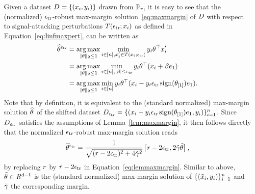 



Given a dataset $D = \{(x_i, y_i)\}$ drawn from $\mathbb{P}_r$, it is easy to see that the (normalized) $\epsilon_{\text{tr}}$-robust max-margin solution~\eqref{eq:maxmargin} of $D$ with respect to signal-attacking perturbations $T({\epsilon_{\text{tr}}};{x_i})$ as defined in Equation~\eqref{eq:linfmaxpert}, can be written as
\begin{equation}
\begin{aligned}
  \label{eq:robmaxmargin}
  \widehat{\theta}^{\epsilon_{\text{tr}}} &= \operatorname*{arg\,max}_{\|\theta\|_2\leq 1}  \min_{i\in [n], x_i' \in T({x_i};{\epsilon_{\text{tr}}})} y_i \theta^\top x'_i \\
  &= \operatorname*{arg\,max}_{\|\theta\|_2\leq 1}\min_{i\in [n],|\beta|\leq \epsilon_{\text{tr}}}y_i \theta^\top (x_i + \beta e_1) \nonumber\\
  &= \operatorname*{arg\,max}_{\|\theta\|_2\leq 1} \min_{i\in [n]} y_i \theta^\top (x_i - y_i \epsilon_{\text{tr}} \operatorname*{sign}(\theta_{[1]}) e_1). \nonumber
\end{aligned}
\end{equation}
Note that by definition, it is equivalent to the (standard normalized)
max-margin solution $\widehat{\theta}^{}$ of the shifted dataset ${D_{\epsilon_{\text{tr}}} =
  \{(x_i - y_i \epsilon_{\text{tr}} \operatorname*{sign}(\theta_{[1]}) e_1,
  y_i)\}_{i=1}^n}$. Since $D_{\epsilon_{\text{tr}}}$ satisfies the assumptions of
Lemma~\ref{lem:maxmargin}, it then follows directly that the
normalized $\epsilon_{\text{tr}}$-robust max-margin solution reads
\begin{equation}
  \label{eq:appmaxmargin}
  \widehat{\theta}^{\epsilon_{\text{tr}}} = \frac{1}{\sqrt{(r -2\epsilon_{\text{tr}})^2 + 4 \tilde{\gamma}^{2}}}\left[r-2\epsilon_{\text{tr}},  2 \tilde{\gamma} \tilde{\theta} \right],
\end{equation}
by replacing $r$ by $r - 2\epsilon_{\text{tr}}$ in
Equation~\eqref{eq:lemmaxmargin}. Similar to above, $\tilde{\theta} \in
R^{d-1}$ is the (standard normalized) max-margin solution of
$\{(\tilde{x}_i, y_i)\}_{i=1}^n$ and $\tilde{\gamma}$ the corresponding
margin.

